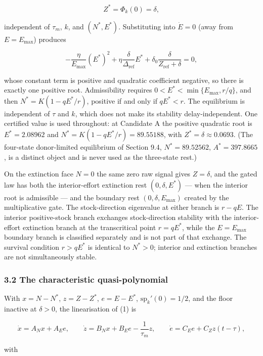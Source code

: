 \documentclass[11pt]{article}
\begin{document}
\[Z^* = \Phi_k(0) = \delta,\]

independent of \(\tau_m\), \(k\), and \((N^*, E^*)\). Substituting into
\(\dot E = 0\) (away from \(E = E_{\max}\)) produces

\[-\frac{\eta}{E_{\max}}(E^*)^2 + \eta\frac{\delta}{\Delta_{\mathrm{ref}}}E^* + \delta_0\frac{\delta}{Z_{\mathrm{ref}} + \delta} = 0,\]

whose constant term is positive and quadratic coefficient negative, so
there is exactly one positive root. Admissibility requires
\(0 < E^* < \min\{E_{\max}, r/q\}\), and then \(N^* = K(1 - qE^*/r)\),
positive if and only if \(qE^* < r\). The equilibrium is independent of
\(\tau\) and \(k\), which does not make its stability delay-independent.
One certified value is used throughout: at Candidate A the positive
quadratic root is \(E^* = 2.08962\) and
\(N^* = K(1 - qE^*/r) = 89.55188\), with
\(Z^* = \delta \approx 0.0693\). (The four-state donor-limited
equilibrium of Section 9.4, \(N^* = 89.52562\), \(A^* = 397.8665\), is a
distinct object and is never used as the three-state rest.)

On the extinction face \(N = 0\) the same zero raw signal gives
\(Z = \delta\), and the gated law has both the interior-effort
extinction rest \((0, \delta, E^*)\) --- when the interior root is
admissible --- and the boundary rest \((0, \delta, E_{\max})\) created
by the multiplicative gate. The stock-direction eigenvalue at either
branch is \(r - qE\). The interior positive-stock branch exchanges
stock-direction stability with the interior-effort extinction branch at
the transcritical point \(r = qE^*\), while the \(E = E_{\max}\)
boundary branch is classified separately and is not part of that
exchange. The survival condition \(r > qE^*\) is identical to
\(N^* > 0\); interior and extinction branches are not simultaneously
stable.

\subsubsection{3.2 The characteristic
quasi-polynomial}\label{the-characteristic-quasi-polynomial}

With \(x = N - N^*\), \(z = Z - Z^*\), \(e = E - E^*\),
\(\mathrm{sp}_k'(0) = 1/2\), and the floor inactive at \(\delta > 0\),
the linearisation of (1) is

\[\dot x = A_N x + A_E e, \qquad \dot z = B_N x + B_E e - \frac{1}{\tau_m}z, \qquad \dot e = C_E e + C_Z z(t - \tau),\]

with
\end{document}
